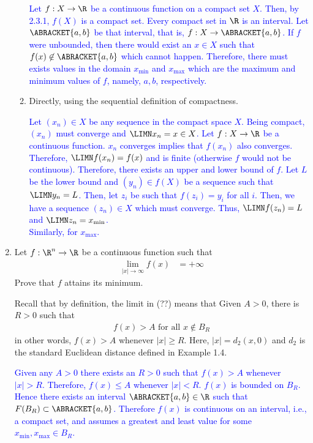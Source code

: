\documentclass[10pt,a4paper]{report}
\newcommand{\BLUE}[1]{\textcolor{blue}{#1}}
\begin{document}
\begin{enumerate}[label=\Roman*.]
\begin{enumerate}[label=\alph*)]
		\BLUE{Let $f: X \to \R$ be a continuous function on a compact set $X$.  Then, by 2.3.1, $f(X)$ is a compact set.  Every compact set in $\R$ is an interval.  Let $\ABRACKET{a,b}$ be that interval, that is, $f: X \to \ABRACKET{a,b}$.  If $f$ were unbounded, then there would exist an $x \in X$ such that $f(x) \not \in \ABRACKET{a,b}$ which cannot happen.  Therefore, there must exists values in the domain $x_{\min}$ and $x_{\max}$ which are the maximum and minimum values of $f$, namely, $a, b$, respectively.
		}
		
		\item Directly, using the sequential definition of compactness.
		
		\BLUE{Let $(x_n) \in X$ be any sequence in the compact space $X$.  Being compact, $(x_n)$ must converge and $\LIMN x_n = x \in X$.  Let $f: X \to \R$ be a continuous function.  $x_n$ converges implies that $f(x_n)$ also converges.  Therefore, $\LIMN f(x_n) = f(x)$ and is finite (otherwise $f$ would not be continuous).  Therefore, there exists an upper and lower bound of $f$.  Let $L$ be the lower bound and $(y_n) \in f(X)$ be a sequence such that $\LIMN y_n = L$.  Then, let $z_i$ be such that $f(z_i) = y_i$ for all $i$.  Then, we have a sequence $(z_n)\in X$ which must converge.  Thus, $\LIMN f(z_n) = L$ and $\LIMN z_n = x_{\min}$.  \\Similarly, for $x_{\max}$.
		}

	\end{enumerate}
	
	\item Let $f:\R^n \to \R$ be a continuous function such that 
	\begin{align*}
		\lim_{|x| \to \infty} f(x) &= + \infty
	\end{align*}Prove that $f$ attains its minimum.
	
	Recall that by definition, the limit in (??) means that Given $A > 0$, there is $R>0$ such that 
	\begin{align*}
		f(x) >A \text{    for all } x \not\in B_R
	\end{align*}in other words, $f(x) >A$ whenever $|x| \ge R$. Here, $|x| = d_2(x,0)$ and $d_2$ is the standard Euclidean distance defined in Example 1.4.
	
	\BLUE{Given any $A> 0$ there exists an $R>0$ such that $f(x) >A$ whenever $|x| > R$.  Therefore, $f(x) \le A$ whenever $|x| < R$.  $f(x)$ is bounded on $B_R$.  Hence there exists an interval $\ABRACKET{a,b} \in \R$ such that $F(B_R) \subset \ABRACKET{a,b}$. Therefore $f(x)$ is continuous on an interval, i.e., a compact set, and assumes a greatest and least value for some $x_{\min}, x_{\max} \in B_R$.
	}
\end{enumerate}
\end{document}
